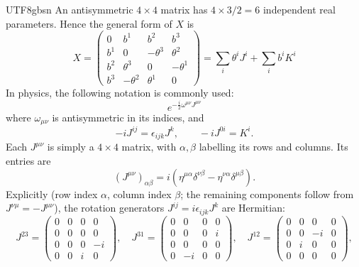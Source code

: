 \documentclass[11pt,a4paper,oneside]{report}
\begin{document}
\begin{CJK*}{UTF8}{gbsn}
An antisymmetric $4\times4$ matrix has $4\times3/2=6$ independent real parameters. Hence the general form of $X$ is
\begin{equation*}
X=\begin{pmatrix}
0&b^1&b^2&b^3\\
b^1&0&-\theta^3&\theta^2\\
b^2&\theta^3&0&-\theta^1\\
b^3&-\theta^2&\theta^1&0
\end{pmatrix}
=\sum_i\theta^iJ^i+\sum_ib^iK^i
\tag{B.34}\label{eq:B.34}
\end{equation*}
In physics, the following notation is commonly used:
\begin{equation*}
e^{-\frac i2\omega^{\mu\nu}J^{\mu\nu}}
\tag{B.35}\label{eq:B.35}
\end{equation*}
where $\omega_{\mu\nu}$ is antisymmetric in its indices, and
\begin{equation*}
-iJ^{ij}=\epsilon_{ijk}J^k,\qquad -iJ^{0i}=K^i.
\tag{B.36}\label{eq:B.36}
\end{equation*}
Each $J^{\mu\nu}$ is simply a $4\times4$ matrix, with $\alpha,\beta$ labelling its rows and columns. Its entries are
\begin{equation*}
(J^{\mu\nu})_{\alpha\beta}=i\left(\eta^{\mu\alpha}\delta^{\nu\beta}-\eta^{\nu\alpha}\delta^{\mu\beta}\right).
\tag{B.37}\label{eq:B.37}
\end{equation*}
Explicitly (row index $\alpha$, column index $\beta$; the remaining components follow from $J^{\nu\mu}=-J^{\mu\nu}$), the rotation generators $J^{ij}=i\epsilon_{ijk}J^k$ are Hermitian:
\begin{equation*}
J^{23}=\begin{pmatrix}0&0&0&0\\0&0&0&0\\0&0&0&-i\\0&0&i&0\end{pmatrix},\quad
J^{31}=\begin{pmatrix}0&0&0&0\\0&0&0&i\\0&0&0&0\\0&-i&0&0\end{pmatrix},\quad
J^{12}=\begin{pmatrix}0&0&0&0\\0&0&-i&0\\0&i&0&0\\0&0&0&0\end{pmatrix},
\tag{B.38}\label{eq:B.38}
\end{equation*}

\end{CJK*}
\end{document}

